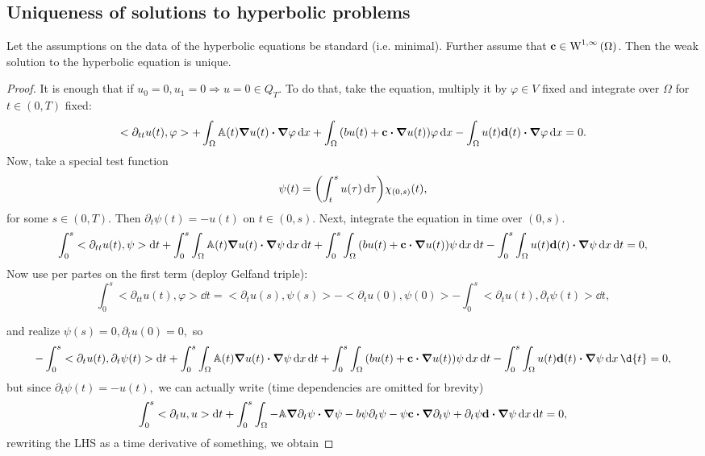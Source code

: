 \documentclass{article}
\begin{document}
\subsection{Uniqueness of solutions to hyperbolic problems}
\label{sec:hyper_uniqueness}

\begin{theorem}
	Let the assumptions on the data of the hyperbolic equations be standard (i.e. minimal). Further assume that $\vb{c} \in \text{W}^{1, \infty}\!\,\left(\Omega \right)$. Then the weak solution to the hyperbolic equation is unique.
\end{theorem}

\begin{proof}
	It is enough that if $u_0 = 0, u_1 = 0 \Rightarrow u = 0 \in Q_T$. To do that, take the equation, multiply it by $\varphi \in V$ fixed and integrate over $\Omega$ for $t \in (0,T)$ fixed:
	\[
		<\partial_{tt}u(t), \varphi> + \int_{\Omega}\tensorq{A}(t) \grad u(t) \vdot \grad \varphi \dd{x} + \int_{\Omega}\qty(b u (t)+ \vb{c} \vdot \grad u (t))\varphi\dd{x} - \int_{\Omega} u(t) \vb{d}(t) \vdot \grad \varphi\dd{x} = 0.
	\]
	Now, take a special test function
	\[
		\psi(t) = \qty(\int_t^s u(\tau) \dd{\tau})\chi_{(0,s)}(t),
	\]
	for some $s \in (0,T).$ Then $\partial_t \psi(t) = -u(t)$ on $t \in (0,s)$. Next, integrate the equation in time over $(0,s).$
	\[
		\int_0^s <\partial_{tt}u(t),\psi>\dd{t} + \int_0^s \int_{\Omega}\tensorq{A}(t) \grad u(t) \vdot \grad \psi\dd{x} \dd{t} + \int_0^s \int_{\Omega}\qty(bu(t) + \vb{c} \vdot \grad u(t))\psi\dd{x} \dd{t} - \int_0^s \int_{\Omega}u(t) \vb{d}(t) \vdot \grad \psi\dd{x} \dd{t} = 0,
	\]
Now use per partes on the first term (deploy Gelfand triple):
\[
	\int_0^s<\partial_{tt}u(t),\varphi>\dd{t} = <\partial_{t}u(s), \psi(s)> - <\partial_t u(0), \psi(0)> - \int_0^s <\partial_t u(t), \partial_t \psi(t)>\dd{t},
\]

	and realize $\psi(s) = 0, \partial_t u(0) =0,$ so
	\[
		- \int_0^s <\partial_t u(t), \partial_t \psi(t)> \dd{t}+ \int_0^s \int_{\Omega}\tensorq{A}(t) \grad u(t) \vdot \grad \psi\dd{x} \dd{t} + \int_0^s \int_{\Omega}\qty(bu(t) + \vb{c} \vdot \grad u(t))\psi\dd{x} \dd{t} - \int_0^s \int_{\Omega}u(t) \vb{d}(t) \vdot \grad \psi\dd{x} \d{t} = 0,
	\]
	but since $\partial_t \psi(t) = - u(t),$ we can actually write (time dependencies are omitted for brevity)
	\[
		\int_0^s <\partial_t u, u> \dd{t} + \int_0^s \int_{\Omega}-\tensorq{A} \grad \partial_t \psi \vdot \grad \psi - b \psi \partial_t \psi - \psi \vb{c} \vdot \grad \partial_t \psi + \partial_t \psi \vb{d} \vdot \grad \psi \dd{x} \dd{t} = 0,
	\]
	rewriting the LHS as a time derivative of something, we obtain


\end{proof}
\end{document}
